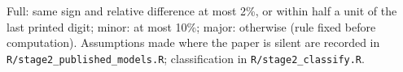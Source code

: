 Full: same sign and relative difference at most 2\%, or within half a unit of the last printed digit; minor: at most 10\%; major: otherwise (rule fixed before computation). Assumptions made where the paper is silent are recorded in \texttt{R/stage2\_published\_models.R}; classification in \texttt{R/stage2\_classify.R}.
